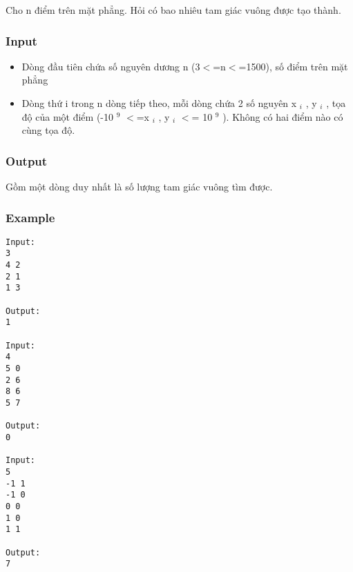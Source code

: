 



   Cho n điểm trên mặt phẳng. Hỏi có bao nhiêu tam giác vuông được tạo thành.  

\subsubsection{   Input  }
\begin{itemize}
	\item     Dòng đầu tiên chứa số nguyên dương n (3$<$=n$<$=1500), số điểm trên mặt phẳng   
	\item     Dòng thứ i trong n dòng tiếp theo, mỗi dòng chứa 2 số nguyên x    $_     i    $    , y    $_     i    $    , tọa độ của một điểm (-10    $^     9    $    $<$=x    $_     i    $    , y    $_     i    $    $<$= 10    $^     9    $    ). Không có hai điểm nào có cùng tọa độ.   
\end{itemize}

\subsubsection{   Output  }

   Gồm một dòng duy nhất là số lượng tam giác vuông tìm được.  

\subsubsection{   Example  }
\begin{verbatim}
Input:
3
4 2
2 1
1 3

Output:
1

Input:
4
5 0
2 6
8 6
5 7

Output:
0

Input:
5
-1 1
-1 0
0 0
1 0
1 1

Output:
7
\end{verbatim}